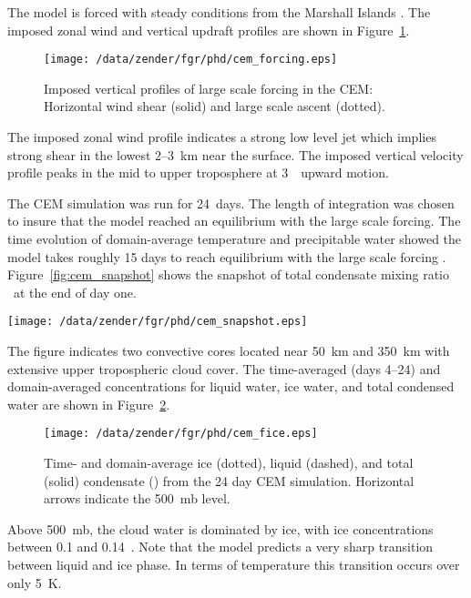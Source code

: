 \documentclass[twoside,agums]{aguplus}
\begin{document}
The model is forced with steady conditions from the Marshall Islands
\cite[]{YEC73}.
The imposed zonal wind and vertical updraft profiles are shown in
Figure~\ref{fig:cem_forcing}. 
\begin{figure}
\begin{center}
\texttt{[image: /data/zender/fgr/phd/cem\_forcing.eps]}
\end{center}
\caption[Imposed vertical profiles of large scale forcing in the
CEM]{
Imposed vertical profiles of large scale forcing in the
CEM: Horizontal wind shear (solid) and large scale ascent
(dotted).\label{fig:cem_forcing}} 
\end{figure}
The imposed zonal wind profile indicates a strong low level jet
which implies strong shear in the lowest 2--3~km near the surface. 
The imposed vertical velocity profile peaks in the mid to upper
troposphere at 3~\cmxs\ upward motion.

The CEM simulation was run for 24~days. 
The length of integration was chosen to insure that the model reached an
equilibrium with the large scale forcing. 
The time evolution of domain-average temperature and precipitable
water showed the model takes roughly 15 days to reach equilibrium
with the large scale forcing \cite[Figure~4,][]{GMK95}. 
Figure~\ref{fig:cem_snapshot} shows the snapshot of total condensate
mixing ratio \qc\ at the end of day one.
\begin{figure*}
\begin{center}
\texttt{[image: /data/zender/fgr/phd/cem\_snapshot.eps]}
\end{center}
\caption[Snapshot of condensed water mixing ratio \qc\ at the 
end of day~1 of the CEM simulation]{Snapshot of condensed water mixing
ratio \qc\ (\gxkg) at the end of day~1 of the CEM
simulation.\label{fig:cem_snapshot}} 
\end{figure*}
The figure indicates two convective cores located near 50~km and 350~km
with extensive upper tropospheric cloud cover.  
The time-averaged (days 4--24) and domain-averaged concentrations for
liquid water, ice water, and total condensed water are shown in
Figure~\ref{fig:cem_fice}. 
\begin{figure}
\begin{center}
\texttt{[image: /data/zender/fgr/phd/cem\_fice.eps]}
\end{center}
\caption[Time- and domain-average ice, liquid, and
total condensate from the 24 day CEM simulation]{
Time- and domain-average ice (dotted), liquid (dashed), and total
(solid) condensate (\gxmS) from the 24 day CEM simulation. 
Horizontal arrows indicate the 500~mb level.\label{fig:cem_fice}}    
\end{figure}
Above 500~mb, the cloud water is dominated by ice,  with ice
concentrations between 0.1 and 0.14~\gxmC.
Note that the model predicts a very sharp transition between liquid and
ice phase.
In terms of temperature this transition occurs over only 5~\dgr K. 
\end{document}
